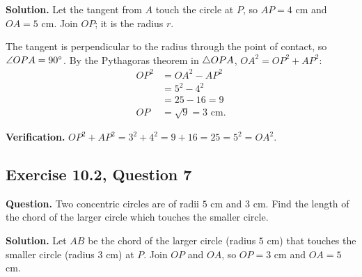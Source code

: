 \textbf{Solution.} Let the tangent from $A$ touch the circle at $P$, so $AP=4$ cm and $OA=5$ cm. Join $OP$; it is the radius $r$.

The tangent is perpendicular to the radius through the point of contact, so $\angle OPA=90^\circ$. By the Pythagoras theorem in $\triangle OPA$, $OA^2=OP^2+AP^2$:
\begin{align*}
OP^2&=OA^2-AP^2\\
&=5^2-4^2\\
&=25-16=9\\
OP&=\sqrt9=3\text{ cm}.
\end{align*}

\textbf{Verification.} $OP^2+AP^2=3^2+4^2=9+16=25=5^2=OA^2$.


\subsection*{Exercise 10.2, Question 7}
\textbf{Question.} Two concentric circles are of radii $5$ cm and $3$ cm. Find the length of the chord of the larger circle which touches the smaller circle.

\begin{center}
%
\end{center}

\textbf{Solution.} Let $AB$ be the chord of the larger circle (radius $5$ cm) that touches the smaller circle (radius $3$ cm) at $P$. Join $OP$ and $OA$, so $OP=3$ cm and $OA=5$ cm.

